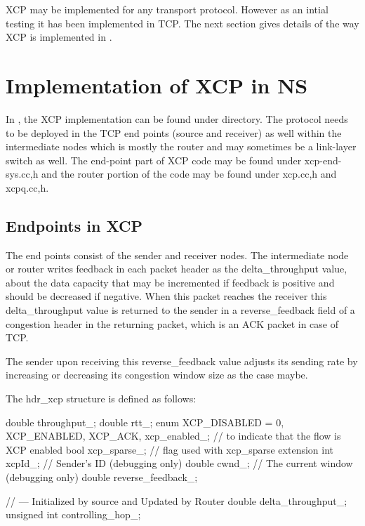 XCP may be implemented for any transport protocol. However as an
intial testing it has been implemented in TCP. The next section
gives details of the way XCP is implemented in \ns{}.


\section{Implementation of XCP in NS}
\label{sec:xcp in ns}

In \ns{}, the XCP implementation can be found under  directory. 
The protocol needs to be deployed in the TCP end points (source and
receiver) as well within the intermediate nodes which is mostly the
router and may sometimes be a link-layer switch as well. The end-point
part of XCP code may be found under xcp-end-sys.{cc,h} and the router
portion of the code may be found under xcp.{cc,h} and xcpq.{cc,h}. 

\subsection{Endpoints in XCP}
\label{sec:endpoints}

The end points consist of the sender and receiver nodes. The
intermediate node or router writes feedback in each packet header as
the delta\_throughput value, about the data capacity that may be
incremented if feedback is positive and should be decreased if
negative. When this packet reaches the receiver this delta\_throughput
value is returned to the sender in a reverse\_feedback field of a
congestion header in the returning packet, which is an ACK packet in
case of TCP. 
  
  The sender upon receiving this reverse\_feedback value adjusts its
  sending rate by increasing or decreasing its congestion window size as
  the case maybe. 

  The hdr\_xcp structure is defined as follows:
  \begin{program}
    double	throughput_;
    double	rtt_;
    enum {
      XCP_DISABLED = 0,
      XCP_ENABLED,
      XCP_ACK,
    } 	xcp_enabled_;		// to indicate that the flow is XCP enabled
    bool	xcp_sparse_;    // flag used with xcp_sparse extension
    int	        xcpId_;		// Sender's ID (debugging only)
    double	cwnd_;		// The current window (debugging only) 
    double	reverse_feedback_; 
    
    // --- Initialized by source and Updated by Router 
    double delta_throughput_;
    unsigned int controlling_hop_;
  \end{program}
  
